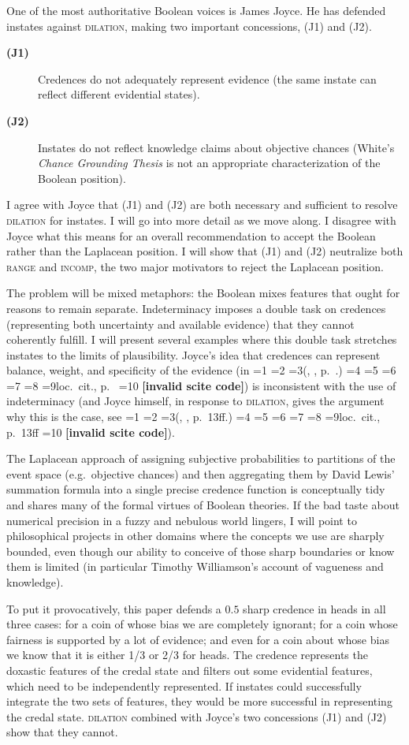 \documentclass[journal]{IEEEtran}
\newcommand{\doxnotep}[0]{doxastic}
\newcommand{\bcut}[1]{}
\newif\ifNumericalOrYear
\newcommand{\PageP}{p.~}
\newcommand{\PageP}{}
\newcommand{\scite}[3]{\ifnum#1=1\ifNumericalOrYear\citep{#2}\else\citeyearpar{#2}\fi\else
\ifnum#1=2\ifNumericalOrYear\citep[#3]{#2}\else\citep[{\PageP}#3]{#2}\fi\else
\ifnum#1=3\ifNumericalOrYear(\citet[#3]{#2})\else(\citeauthor{#2}, \citeyear{#2}, {\PageP}#3.)\fi\else
\ifnum#1=4\ifNumericalOrYear\citet{#2}\else\citet{#2}\fi\else
\ifnum#1=5\ifNumericalOrYear(\citet{#2})\else\citep{#2}\fi\else
\ifnum#1=6\ifNumericalOrYear(\citet[#3]{#2})\else\citep[{\PageP}#3]{#2}\fi\else
\ifnum#1=7\ifNumericalOrYear\citep{#2}\else\citealp{#2}\fi\else
\ifnum#1=8\ifNumericalOrYear\citep[#3]{#2}\else\citealp[{\PageP}#3]{#2}\fi\else
\ifnum#1=9\ifNumericalOrYear\citep[#3]{#2}\else{}loc.\ cit., {\PageP}#3\fi\else
\ifnum#1=10\ifNumericalOrYear\citep{#2}\else\citeyear{#2}\fi\else
\textbf{[invalid scite code]}\fi\fi\fi\fi\fi\fi\fi\fi\fi\fi}
\begin{document}
One of the most authoritative Boolean voices is James Joyce. He has
defended instates against \textsc{dilation}, making two important
concessions, (J1) and (J2).

\begin{description}
\item[{\bf (J1)}] Credences do not adequately represent evidence (the
  same instate can reflect different evidential states).
\item[{\bf (J2)}] Instates do not reflect knowledge claims about
  objective chances (White's \emph{Chance Grounding Thesis} is not an
  appropriate characterization of the Boolean position).
\end{description}

I agree with Joyce that (J1) and (J2) are both necessary and
sufficient to resolve \textsc{dilation} for instates. I will go into
more detail as we move along. I disagree with Joyce what this means
for an overall recommendation to accept the Boolean rather than the
Laplacean position. I will show that (J1) and (J2) neutralize both
\textsc{range} and \textsc{incomp}, the two major motivators to reject
the Laplacean position.

The problem will be mixed metaphors: the Boolean mixes features that
ought for reasons to remain separate. Indeterminacy imposes a double
task on credences (representing both uncertainty and available
evidence) that they cannot coherently fulfill. I will present several
examples where this double task stretches instates to the limits of
plausibility. Joyce's idea that credences can represent balance,
weight, and specificity of the evidence (in \scite{7}{joyce05}{}) is
inconsistent with the use of indeterminacy (and Joyce himself, in
response to \textsc{dilation}, gives the argument why this is the
case, see \scite{8}{joyce10}{13ff}). 

The Laplacean approach of assigning subjective probabilities to
partitions of the event space (e.g.\ objective chances) and then
aggregating them by David Lewis' summation formula into a single
precise credence function is conceptually tidy and shares many of the
formal virtues of Boolean theories. If the bad taste about numerical
precision in a fuzzy and nebulous world lingers, I will point to
philosophical projects in other domains where the concepts we use are
sharply bounded, even though our ability to conceive of those sharp
boundaries or know them is limited (in particular Timothy Williamson's
account of vagueness and knowledge).

To put it provocatively, this paper defends a $0.5$ sharp credence in
heads in all three cases: for a coin of whose bias we are completely
ignorant; for a coin whose fairness is supported by a lot of evidence;
and even for a coin about whose bias we know that it is either 1/3 or
2/3 for heads. The credence represents the {\doxnotep} features of the
credal state and filters out some evidential features, which need to
be independently represented. If instates could successfully integrate
the two sets of features, they would be more successful in
representing the credal state. \textsc{dilation} combined with Joyce's
two concessions (J1) and (J2) show that they cannot.\bcut{4}\bcut{5}
\end{document}
